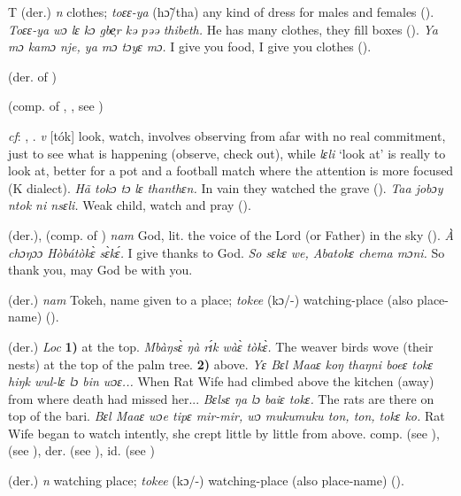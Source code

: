 \begin{letter}{T}
 (der.) \textit{n} clothes; \textit{toɛɛ-ya} (hɔ̃/tha) any kind of dress for males and females (\citealt{Pichl1967}). \textit{Toɛɛ-ya wɔ lɛ kɔ gbe̹r kə pəə thibeth.} He has many clothes, they fill boxes (\citealt{Pichl1967}). \textit{Ya mɔ kamɔ nje, ya mɔ tɔyɛ mɔ.} I give you food, I give you clothes (\citealt{Pichl1967}).

 (der. of ) 

 (comp. of , , see ) 

 \textit{cf}: , . \textit{v} [tók] look, watch, involves observing from afar with no real commitment, just to see what is happening (observe, check out), while \textit{lɛli} ‘look at' is really to look at, better for a pot and a football match where the attention is more focused (K dialect). \textit{Hã tokɔ tɔ lɛ thanthɛn.} In vain they watched the grave (\citealt{Pichl1967}). \textit{Taa jobɔy ntok ni nsɛli.} Weak child, watch and pray (\citealt{Pichl1967}). 

 (der.), (comp. of ) \textit{nam} God, lit. the voice of the Lord (or Father) in the sky (\citealt{Pichl1967}). \textit{À chɔŋɔɔ Hòbátòkɛ̀ sɛ̀kɛ́.} I give thanks to God. \textit{So sɛkɛ we, Abatokɛ chema mɔni.} So thank you, may God be with you.

 (der.) \textit{nam} Tokeh, name given to a place; \textit{tokee} (kɔ/-) watching-place (also place-name) (\citealt{Pichl1967}).

 (der.) \textit{Loc} \textbf{1)} at the top. \textit{Mbàŋsɛ̀ ŋà rɪ́k wàɛ̀ tòkɛ̀.} The weaver birds wove (their nests) at the top of the palm tree. \textbf{2)} above. \textit{Yɛ Bɛl Maaɛ koŋ thaŋni boeɛ tokɛ hiŋk wul-lɛ lɔ bin wɔɛ...} When Rat Wife had climbed above the kitchen (away) from where death had missed her... \textit{Bɛlsɛ ŋa lɔ baiɛ tokɛ.} The rats are there on top of the bari. \textit{Bɛl Maaɛ wɔe tipɛ mir-mir, wɔ mukumuku ton, ton, tokɛ ko.} Rat Wife began to watch intently, she crept little by little from above. comp.  (see ),  (see ), der.  (see ), id.  (see )

 (der.) \textit{n} watching place; \textit{tokee} (kɔ/-) watching-place (also place-name) (\citealt{Pichl1967}).


\end{letter}
